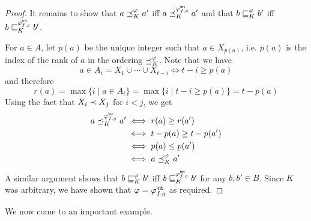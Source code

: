 \begin{proof}
    It remains to show that $a \preceq_K^\varphi a'$ iff $a \preceq_K^{{\varphi_{f,g}^\mathsf{int}}} a'$
    and that $b \sqsubseteq_K^\varphi b'$ iff $b \sqsubseteq_K^{{\varphi_{f,g}^\mathsf{int}}} b'$.

    For $a \in A$, let $p(a)$ be the unique integer such that $a \in X_{p(a)}$,
    i.e. $p(a)$ is the index of the rank of $a$ in the ordering
    ${\preceq_K^\varphi}$. Note that we have
    \[
        a \in A_i = X_1 \cup \cdots \cup X_{t-i}
        \iff
        t - i \ge p(a)
    \]
    and therefore
    \[
        r(a)
        = \max\{i \mid a \in A_i\}
        = \max\{i \mid t - i \ge p(a)\}
        = t - p(a)
    \]
    Using the fact that $X_i \prec X_j$ for $i < j$, we get
    \begin{align*}
        a \preceq_K^{{\varphi_{f,g}^\mathsf{int}}} a'
        &\iff r(a) \ge r(a') \\
        &\iff t - p(a) \ge t - p(a') \\
        &\iff p(a) \le p(a') \\
        &\iff a \preceq_K^\varphi a'
    \end{align*}
    A similar argument shows that $b \sqsubseteq_K^\varphi b'$ iff $b
    \sqsubseteq_K^{{\varphi_{f,g}^\mathsf{int}}} b'$ for any $b, b' \in B$. Since $K$ was arbitrary, we
    have shown that $\varphi = {\varphi_{f,g}^\mathsf{int}}$ as required.
\end{proof}

We now come to an important example.


